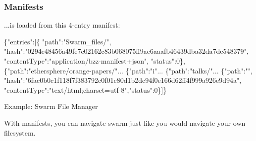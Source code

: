 \begin{frame}[fragile]
\frametitle{Manifests}
 ...is loaded from this 4-entry manifest:\\
\tiny
\begin{semiverbatim}
\{"entries":[\{
"path":"Swarm_files/",
"hash":"0294e48456a49fe7c02162c83b068075ff9ae6aaafb46439dba32da7de548379",
"contentType":"application/bzz-manifest+json",
"status":0\},
\{"path":"ethersphere/orange-papers/"...
\{"path":"i"...
\{"path":"talks/"...
\{"path":"",
"hash":"6fac0b0c1f118f7f383792c0f01c80d1b2dc94f0e166d62ff4f999a926e9d94a",
"contentType":"text/html;charset=utf-8","status":0\}]\}\end{semiverbatim}
\end{frame}

\begin{subsection}{Example: Swarm File Manager}
 \begin{frame}
  With manifests, you can navigate swarm just like you would navigate your own filesystem.\\
 \end{frame}
\end{subsection}


